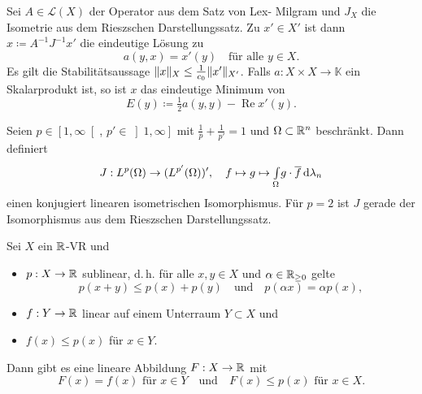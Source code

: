 \documentclass{cheat-sheet}
\newcommand{\K}{\mathbb{K}}
\newcommand{\LSO}{\mathcal{L}} %
\renewcommand{\Re}{\operatorname{Re}} %
\begin{document}
\begin{kor}
  Sei $A \in \LSO(X)$ der Operator aus dem Satz von Lex- Milgram und $J_X$ die Isometrie aus dem Rieszschen Darstellungssatz. Zu $x' \in X'$ ist dann $x \coloneqq A^{-1} J^{-1} x'$ die eindeutige Lösung zu
  \[ a(y, x) = x'(y) \quad \text{für alle $y \in X$.} \]
  Es gilt die Stabilitätsaussage $\lVert x\rVert_X \leq \tfrac{1}{c_0} \lVert x'\rVert_{X'}$.
  Falls $a : X {\times} X \to \K$ ein Skalarprodukt ist, so ist $x$ das eindeutige Minimum von
  \[ E(y) \coloneqq \tfrac{1}{2} a(y, y) - \Re x'(y). \]
\end{kor}


%



\begin{satz}
  Seien $p \in \left[ 1, \infty \right[$, $p' \in \left] 1, \infty \right]$ mit $\tfrac{1}{p} + \tfrac{1}{p'} = 1$ und $\Omega \subset \mathbb{R}^n$ beschränkt. Dann definiert
  \[ J : L^p(\Omega) \to (L^{p'}(\Omega))', \quad f \mapsto g \mapsto {\textstyle \int\limits_{\Omega}^{}} g \cdot \overline{f} \,\mathrm{d} \lambda_n \]
  einen konjugiert linearen isometrischen Isomorphismus. Für $p=2$ ist $J$ gerade der Isomorphismus aus dem Rieszschen Darstellungssatz.
\end{satz}





\begin{satz}
  Sei $X$ ein $\mathbb{R}$-VR und
  \begin{itemize}
    \item $p : X \to \mathbb{R}$ sublinear, d.\,h. für alle $x, y \in X$ und $\alpha \in \mathbb{R}_{\geq 0}$ gelte
    \[ p(x+y) \leq p(x) + p(y) \quad \text{und} \quad p(\alpha x) = \alpha p(x), \]
    \item $f : Y \to \mathbb{R}$ linear auf einem Unterraum $Y \subset X$ und
    \item $f(x) \leq p(x)$ für $x \in Y$.
  \end{itemize}
  Dann gibt es eine lineare Abbildung $F : X \to \mathbb{R}$ mit
  \[ F(x) = f(x) \text{ für $x \in Y$} \quad \text{und} \quad F(x) \leq p(x) \text{ für } x \in X. \]
\end{satz}
\end{document}
